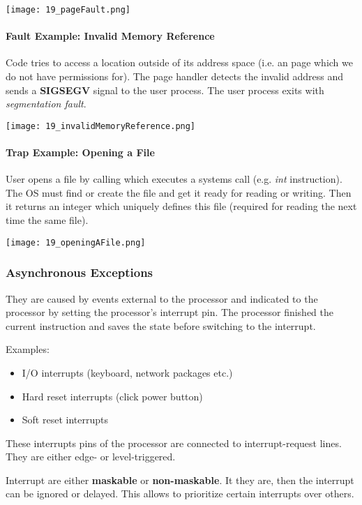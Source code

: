 \texttt{[image: 19\_pageFault.png]}

\paragraph{Fault Example: Invalid Memory Reference}
Code tries to access a location outside of its address space (i.e. an page which we do not have permissions for). The page handler detects the invalid address and sends a \textbf{SIGSEGV} signal to the user process. The user process exits with \textit{segmentation fault}.

\texttt{[image: 19\_invalidMemoryReference.png]}

\paragraph{Trap Example: Opening a File}
User opens a file by calling  which executes a systems call (e.g. \textit{int} instruction). The OS must find or create the file and get it ready for reading or writing. Then it returns an integer which uniquely defines this file (required for reading the next time the same file).

\texttt{[image: 19\_openingAFile.png]}

\subsubsection{Asynchronous Exceptions}
They are caused by events external to the processor and indicated to the processor by setting the processor's interrupt pin. The processor finished the current instruction and saves the state before switching to the interrupt.

Examples:
\begin{itemize}
    \item I/O interrupts (keyboard, network packages etc.)
    \item Hard reset interrupts (click power button)
    \item Soft reset interrupts
\end{itemize}

These interrupts pins of the processor are connected to interrupt-request lines. They are either edge- or level-triggered.

Interrupt are either \textbf{maskable} or \textbf{non-maskable}. It they are, then the interrupt can be ignored or delayed. This allows to prioritize certain interrupts over others.

